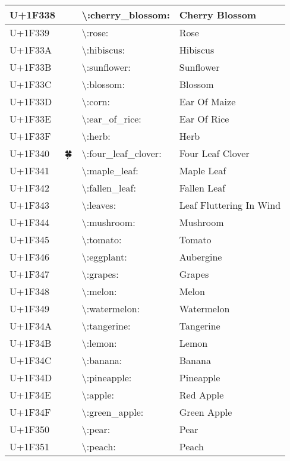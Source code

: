 \begin{table}[h]
\begin{tabulary}{\linewidth}{|L|L|L|L|}
\hline
U+1F338 & 🌸 & {\textbackslash}:cherry\_blossom: & Cherry Blossom \\
\hline
U+1F339 & 🌹 & {\textbackslash}:rose: & Rose \\
\hline
U+1F33A & 🌺 & {\textbackslash}:hibiscus: & Hibiscus \\
\hline
U+1F33B & 🌻 & {\textbackslash}:sunflower: & Sunflower \\
\hline
U+1F33C & 🌼 & {\textbackslash}:blossom: & Blossom \\
\hline
U+1F33D & 🌽 & {\textbackslash}:corn: & Ear Of Maize \\
\hline
U+1F33E & 🌾 & {\textbackslash}:ear\_of\_rice: & Ear Of Rice \\
\hline
U+1F33F & 🌿 & {\textbackslash}:herb: & Herb \\
\hline
U+1F340 & 🍀 & {\textbackslash}:four\_leaf\_clover: & Four Leaf Clover \\
\hline
U+1F341 & 🍁 & {\textbackslash}:maple\_leaf: & Maple Leaf \\
\hline
U+1F342 & 🍂 & {\textbackslash}:fallen\_leaf: & Fallen Leaf \\
\hline
U+1F343 & 🍃 & {\textbackslash}:leaves: & Leaf Fluttering In Wind \\
\hline
U+1F344 & 🍄 & {\textbackslash}:mushroom: & Mushroom \\
\hline
U+1F345 & 🍅 & {\textbackslash}:tomato: & Tomato \\
\hline
U+1F346 & 🍆 & {\textbackslash}:eggplant: & Aubergine \\
\hline
U+1F347 & 🍇 & {\textbackslash}:grapes: & Grapes \\
\hline
U+1F348 & 🍈 & {\textbackslash}:melon: & Melon \\
\hline
U+1F349 & 🍉 & {\textbackslash}:watermelon: & Watermelon \\
\hline
U+1F34A & 🍊 & {\textbackslash}:tangerine: & Tangerine \\
\hline
U+1F34B & 🍋 & {\textbackslash}:lemon: & Lemon \\
\hline
U+1F34C & 🍌 & {\textbackslash}:banana: & Banana \\
\hline
U+1F34D & 🍍 & {\textbackslash}:pineapple: & Pineapple \\
\hline
U+1F34E & 🍎 & {\textbackslash}:apple: & Red Apple \\
\hline
U+1F34F & 🍏 & {\textbackslash}:green\_apple: & Green Apple \\
\hline
U+1F350 & 🍐 & {\textbackslash}:pear: & Pear \\
\hline
U+1F351 & 🍑 & {\textbackslash}:peach: & Peach \\

\end{tabulary}
\end{table}
